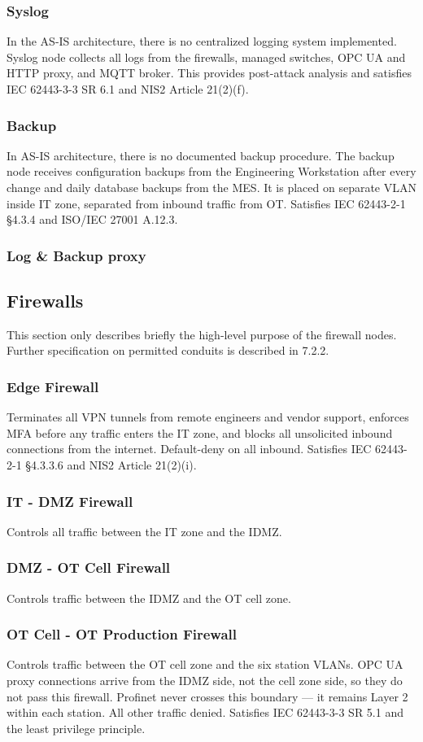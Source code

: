 \subsubsection{Syslog}
In the AS-IS architecture, there is no centralized logging system implemented.
Syslog node collects all logs from the firewalls, managed switches, OPC UA and HTTP proxy, and MQTT broker.
This provides post-attack analysis and satisfies IEC 62443-3-3 SR 6.1 and NIS2 Article 21(2)(f). 
\subsubsection{Backup}
In AS-IS architecture, there is no documented backup procedure. The backup node receives
configuration backups from the Engineering Workstation after every change and daily database
backups from the MES. It is placed on separate VLAN inside IT zone, separated from
inbound traffic from OT. Satisfies IEC 62443-2-1 §4.3.4 and ISO/IEC 27001 A.12.3.
\subsubsection{Log \& Backup proxy}


\subsection{Firewalls}

This section only describes briefly the high-level purpose of the firewall nodes.
Further specification on permitted conduits is described in 7.2.2.
\subsubsection{Edge Firewall}
Terminates all VPN tunnels from remote engineers and vendor support, 
enforces MFA before any traffic enters the IT zone, and blocks all unsolicited inbound 
connections from the internet. Default-deny on all inbound. 
Satisfies IEC 62443-2-1 §4.3.3.6 and NIS2 Article 21(2)(i).
\subsubsection{IT - DMZ Firewall}
Controls all traffic between the IT zone and the IDMZ. 
\subsubsection{DMZ - OT Cell Firewall}
Controls traffic between the IDMZ and the OT cell zone. 
\subsubsection{OT Cell - OT Production Firewall}
Controls traffic between the OT cell zone and the six station VLANs. 
OPC UA proxy connections arrive from the IDMZ side, not the cell zone side, 
so they do not pass this firewall. Profinet never crosses this boundary — 
it remains Layer 2 within each station. All other traffic denied. 
Satisfies IEC 62443-3-3 SR 5.1 and the least privilege principle.



